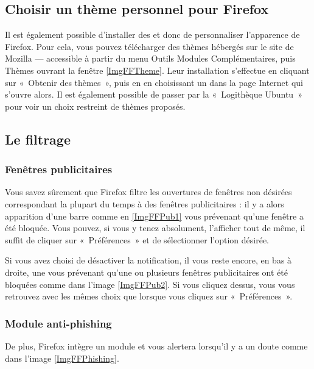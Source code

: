 \subsection{Choisir un thème personnel pour Firefox}
Il est également possible d'installer des  et donc de personnaliser l'apparence de Firefox. Pour cela, vous pouvez télécharger des thèmes hébergés sur le site de Mozilla --- accessible à partir du menu Outils \FlecheDroite Modules Complémentaires, puis Thèmes ouvrant la fenêtre \ref{ImgFFTheme}. Leur installation s'effectue en cliquant sur «~Obtenir des thèmes~», puis en en choisissant un dans la page Internet qui s'ouvre alors. Il est également possible de passer par la «~Logithèque Ubuntu~» pour voir un choix restreint de thèmes proposés.
\subsection{Le filtrage}
\subsubsection{Fenêtres publicitaires}
Vous savez sûrement que Firefox filtre les ouvertures de fenêtres non désirées correspondant la plupart du temps à des fenêtres publicitaires : il y a alors apparition d'une barre comme en \ref{ImgFFPub1} vous prévenant qu'une fenêtre a été bloquée. Vous pouvez, si vous y tenez absolument, l'afficher tout de même, il suffit de cliquer sur «~Préférences~» et de sélectionner l'option désirée.\par
{}
Si vous avez choisi de désactiver la notification, il vous reste encore, en bas à droite, une  vous prévenant qu'une ou plusieurs fenêtres publicitaires ont été bloquées comme dans l'image \ref{ImgFFPub2}. Si vous cliquez dessus, vous vous retrouvez avec les mêmes choix que lorsque vous cliquez sur «~Préférences~».
\subsubsection{Module anti-phishing}
De plus, Firefox intègre un module  et vous alertera lorsqu'il y a un doute comme dans l'image \ref{ImgFFPhishing}.
